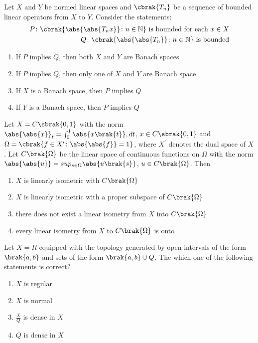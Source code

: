 \item Let $X$ and $Y$ be normed linear spaces and $\cbrak{T_n}$ be a sequence of bounded linear operators from $X$ to $Y$. Consider the statements:
\begin{align*}
    P \colon \cbrak{\abs{\abs{T_n x}} \colon n \in \mathbb{N}} \text{ is bounded for each } x \in X\\
    Q \colon \cbrak{\abs{\abs{T_n}} \colon n \in \mathbb{N}} \text{ is bounded}
\end{align*}
    \begin{enumerate}
        \item If $P$ implies $Q$, then both $X$ and $Y$ are Banach spaces
        \item If $P$ implies $Q$, then only one of $X$ and $Y$ are Banach space
        \item If $X$ is a Banach space, then $P$ implies $Q$
        \item If $Y$ is a Banach space, then $P$ implies $Q$
    \end{enumerate}

\item Let $X = C\sbrak{0,1}$ with the norm $\abs{\abs{x}}_t  = \int_0^1 \abs{x\brak{t}}, dt$, $x \in C \sbrak{0,1}$ and $\Omega = \cbrak{f \in X^{\prime} \colon \abs{\abs{f}} = 1}$, where $X^{\prime}$ denotes the dual space of $X$. Let $C\brak{\Omega}$ be the linear space of continuous functions on $\Omega$ with the norm $\abs{\abs{u}} = sup _{s \in \Omega} \abs{u\brak{s}}$, $u \in C\brak{\Omega}$. Then
    \begin{enumerate}
        \item $X$ is linearly isometric with $C\brak{\Omega}$
        \item $X$ is linearly isometric with a proper subspace of $C\brak{\Omega}$ 
        \item there does not exist a linear isometry from $X$ into $C\brak{\Omega}$
        \item every linear isometry from $X$ to $C\brak{\Omega}$ is onto
    \end{enumerate}

\item Let $X = R$ equipped with the topology generated by open intervals of the form $\brak{
		a,b}$ and sets of the form $\brak{a,b} \cup Q$. The which one of the following statements is correct?
\begin{multicols}{2}
    \begin{enumerate}
        \item $X$ is regular
        \item $X$ is normal
        \item $\frac{X}{Q}$ is dense in $X$
        \item $Q$ is dense in $X$
    \end{enumerate}
\end{multicols}

